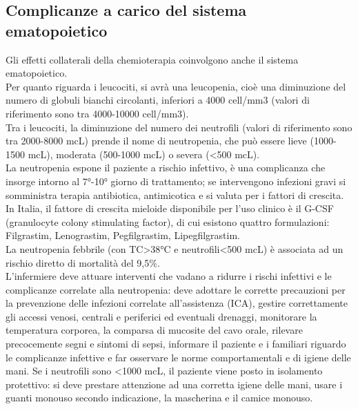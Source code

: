 \subsection{Complicanze a carico del sistema ematopoietico}

Gli effetti collaterali della chemioterapia coinvolgono anche il sistema ematopoietico.\\
Per quanto riguarda i leucociti, si avrà una leucopenia, cioè una diminuzione del numero di globuli bianchi 
circolanti, inferiori a 4000 cell/mm3 (valori di riferimento sono tra 4000-10000 cell/mm3).\\ 
Tra i leucociti, la diminuzione del numero dei neutrofili (valori di riferimento sono tra 2000-8000 mcL) 
prende il nome di neutropenia, che può essere lieve (1000-1500 mcL), moderata (500-1000 mcL) o severa (<500 mcL).\\ 
La neutropenia espone il paziente a rischio infettivo, è una complicanza che insorge intorno al 7°-10° giorno di 
trattamento; se intervengono infezioni gravi si somministra terapia antibiotica, antimicotica e si valuta per i 
fattori di crescita\cite{AIOMTOSS}. In Italia, il fattore di crescita mieloide disponibile per l’uso clinico 
è il G-CSF (granulocyte colony stimulating factor), di cui esistono quattro formulazioni: 
Filgrastim, Lenograstim, Pegfilgrastim, Lipegfilgrastim\cite{AIOMTOSS}.\\
La neutropenia febbrile (con TC>38°C e neutrofili<500 mcL) è associata ad un rischio diretto di mortalità del 9,5\%.\\ 
L’infermiere deve attuare interventi che vadano a ridurre i rischi infettivi e le complicanze correlate alla 
neutropenia: deve adottare le corrette precauzioni per la prevenzione delle infezioni correlate all’assistenza (ICA), 
gestire correttamente gli accessi venosi, centrali e periferici ed eventuali drenaggi, monitorare la temperatura 
corporea, la comparsa di mucosite del cavo orale, rilevare precocemente segni e sintomi di sepsi, informare il 
paziente e i familiari riguardo le complicanze infettive e far osservare le norme comportamentali e di igiene delle mani. 
Se i neutrofili sono <1000 mcL, il paziente viene posto in isolamento protettivo: si deve prestare attenzione 
ad una corretta igiene delle mani, usare i guanti monouso secondo indicazione, la mascherina e il camice monouso\cite{ISOLAMENTO}.\\

